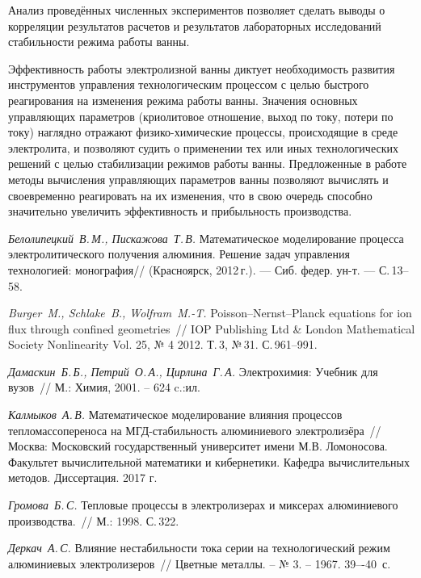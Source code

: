 \documentclass[]{pmi}
\begin{document}
Анализ проведённых численных экспериментов позволяет сделать выводы о корреляции результатов расчетов и результатов лабораторных исследований стабильности режима работы ванны.


Эффективность работы электролизной ванны диктует необходимость развития инструментов управления технологическим процессом с целью быстрого реагирования на изменения режима работы ванны. Значения основных управляющих параметров (криолитовое отношение, выход по току, потери по току) наглядно отражают физико-химические процессы, происходящие в среде электролита, и позволяют судить о применении тех или иных технологических решений с целью стабилизации режимов работы ванны. Предложенные в работе методы вычисления управляющих параметров ванны позволяют вычислять и своевременно реагировать на их изменения, что в свою очередь способно значительно увеличить эффективность и прибыльность производства.

\begin{pmireferences}
    \item
    \label{litlink:belo}
    \textit{Белолипецкий~В.\,М., Пискажова~Т.\,В.}
    Математическое моделирование процесса электролитического получения алюминия. Решение задач управления технологией: монография//
    (Красноярск, 2012\,г.). --- Сиб. федер. ун-т. ---
    С.\,13--58.
    \item
    \label{litlink:burger}
    \textit{Burger~M., Schlake~B., Wolfram~M.-T.}
    Poisson–Nernst–Planck equations for ion flux through confined geometries~// IOP Publishing Ltd \& London Mathematical Society Nonlinearity
    Vol. 25, № 4 2012. Т.\,3, №\,31.
    С.\,961--991.
    \item
    \label{litlink:damaskin}
    \textit{Дамаскин~Б.\,Б., Петрий~О.\,А., Цирлина~Г.\,А.}
    Электрохимия: Учебник для вузов~// 
    М.: Химия, 2001. – 624 c.:ил.
    \item
    \label{litlink:kalmykov}
    \textit{Калмыков~А.\,В.}
    Математическое моделирование влияния процессов тепломассопереноса на МГД-стабильность алюминиевого электролизёра~// Москва: Московский государственный университет имени М.В. Ломоносова. Факультет вычислительной математики и кибернетики. Кафедра вычислительных методов. Диссертация. 2017 г.
    \item
    \label{litlink:VAMI}
    \textit{Громова~Б.\,С.}
    Тепловые процессы в электролизерах и миксерах алюминиевого производства.~// М.: 1998. С.\,322.
    \item
    \label{litlink:derkach2}
    \textit{Деркач~А.\,С.}
    Влияние нестабильности тока серии на технологический режим алюминиевых электролизеров~// Цветные металлы. – № 3. – 1967. 39–-40~с.
    \end{pmireferences}
\end{document}
